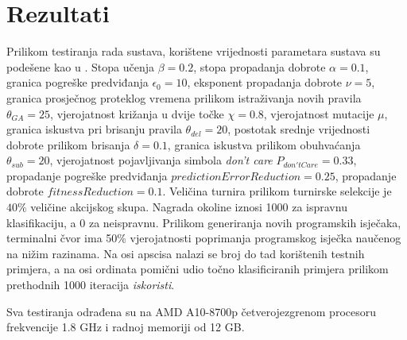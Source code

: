 \documentclass[times, utf8, zavrsni]{fer}
\begin{document}
\chapter{Rezultati} \label{ch:res}
Prilikom testiranja rada sustava, korištene vrijednosti parametara sustava su podešene kao u \citep{4}.
Stopa učenja $\beta = 0.2$, stopa propadanja dobrote $\alpha = 0.1$, granica pogreške predviđanja $\epsilon_{0} = 10$, eksponent propadanja dobrote $\nu = 5$, granica prosječnog proteklog vremena prilikom istraživanja novih pravila $\theta_{GA} = 25$, vjerojatnost križanja u dvije točke $\chi = 0.8$, vjerojatnost mutacije $\mu$, granica iskustva pri brisanju pravila $\theta_{del} = 20$, postotak srednje vrijednosti dobrote prilikom brisanja $\delta = 0.1$, granica iskustva prilikom obuhvaćanja $\theta_{sub} = 20$, vjerojatnost pojavljivanja simbola \emph{don't care} $P_{don'tCare} = 0.33$, propadanje pogreške predviđanja $predictionErrorReduction = 0.25$, propadanje dobrote $fitnessReduction = 0.1$.
Veličina turnira prilikom turnirske selekcije je $40\%$ veličine akcijskog skupa.
Nagrada okoline iznosi 1000 za ispravnu klasifikaciju, a 0 za neispravnu.
Prilikom generiranja novih programskih isječaka, terminalni čvor ima 50\% vjerojatnosti poprimanja programskog isječka naučenog na nižim razinama.
Na osi apscisa nalazi se broj do tad korištenih testnih primjera, a na osi ordinata pomični udio točno klasificiranih primjera prilikom prethodnih 1000 iteracija \emph{iskoristi}.

Sva testiranja odrađena su na AMD A10-8700p četverojezgrenom procesoru frekvencije 1.8 GHz i radnoj memoriji od 12 GB.
\end{document}

